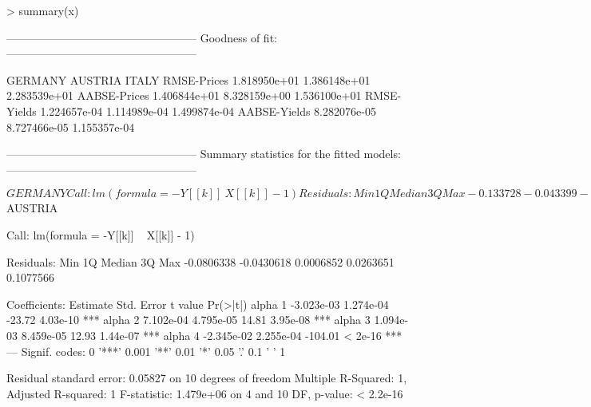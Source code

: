 \begin{Schunk}
\begin{Sinput}
> summary(x)
\end{Sinput}
\begin{Soutput}
---------------------------------------------------
Goodness of fit:
---------------------------------------------------

                  GERMANY      AUSTRIA        ITALY
RMSE-Prices  1.818950e+01 1.386148e+01 2.283539e+01
AABSE-Prices 1.406844e+01 8.328159e+00 1.536100e+01
RMSE-Yields  1.224657e-04 1.114989e-04 1.499874e-04
AABSE-Yields 8.282076e-05 8.727466e-05 1.155357e-04

---------------------------------------------------
Summary statistics for the fitted models:
---------------------------------------------------

$GERMANY

Call:
lm(formula = -Y[[k]] ~ X[[k]] - 1)

Residuals:
      Min        1Q    Median        3Q       Max 
-0.133728 -0.043399 -0.009263  0.019054  0.337135 

Coefficients:
          Estimate Std. Error t value Pr(>|t|)    
alpha 1 -3.156e-03  4.765e-04  -6.623 7.51e-07 ***
alpha 2 -1.804e-04  1.572e-04  -1.148    0.262    
alpha 3  8.893e-04  4.782e-05  18.598 9.25e-16 ***
alpha 4  9.870e-04  6.148e-05  16.053 2.45e-14 ***
alpha 5 -2.357e-02  5.786e-04 -40.734  < 2e-16 ***
---
Signif. codes:  0 '***' 0.001 '**' 0.01 '*' 0.05 '.' 0.1 ' ' 1 

Residual standard error: 0.1084 on 24 degrees of freedom
Multiple R-Squared:     1,	Adjusted R-squared:     1 
F-statistic: 1.693e+06 on 5 and 24 DF,  p-value: < 2.2e-16 


$AUSTRIA

Call:
lm(formula = -Y[[k]] ~ X[[k]] - 1)

Residuals:
       Min         1Q     Median         3Q        Max 
-0.0806338 -0.0430618  0.0006852  0.0263651  0.1077566 

Coefficients:
          Estimate Std. Error t value Pr(>|t|)    
alpha 1 -3.023e-03  1.274e-04  -23.72 4.03e-10 ***
alpha 2  7.102e-04  4.795e-05   14.81 3.95e-08 ***
alpha 3  1.094e-03  8.459e-05   12.93 1.44e-07 ***
alpha 4 -2.345e-02  2.255e-04 -104.01  < 2e-16 ***
---
Signif. codes:  0 '***' 0.001 '**' 0.01 '*' 0.05 '.' 0.1 ' ' 1 

Residual standard error: 0.05827 on 10 degrees of freedom
Multiple R-Squared:     1,	Adjusted R-squared:     1 
F-statistic: 1.479e+06 on 4 and 10 DF,  p-value: < 2.2e-16 



\end{Soutput}
\end{Schunk}
